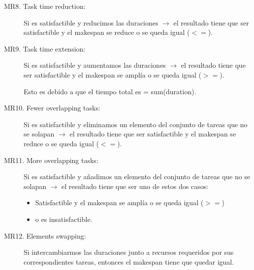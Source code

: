 \begin{description}
\item[MR8. Task time reduction:]  Si es satisfactible y reducimos las duraciones $\rightarrow$ el resultado tiene que ser satisfactible y el makespan se reduce o se queda igual ($<=$).

\item[MR9. Task time extension:]   Si es satisfactible y aumentamos las duraciones $\rightarrow$  el resultado tiene que ser satisfactible y el makespan se amplía o se queda igual ($>=$). 

Esto es debido a que el tiempo total es = sum(duration).


\item[MR10. Fewer overlapping tasks:]  Si es satisfactible y eliminamos un elemento del conjunto de tareas que no se solapan  $\rightarrow$ el resultado tiene que ser satisfactible y el makespan se reduce o se queda igual ($<=$).

\item[MR11. More overlapping tasks:]   Si es satisfactible y añadimos un elemento del conjunto de tareas que no se solapan  $\rightarrow$ el resultado tiene que ser uno de estos dos casos: 

\begin{itemize}
    \item Satisfactible y el makespan se amplía o se queda igual ($>=$)
    \item o es insatisfactible.
\end{itemize}

\item[MR12. Elements swapping: ] Si intercambiarmos las duraciones junto a   recursos requeridos por sus correspondientes tareas, entonces el makespan tiene que quedar igual.

\end{description}



